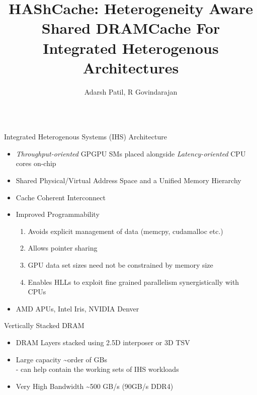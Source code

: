 \documentclass[final,t]{beamer}
\title{\LARGE HAShCache: Heterogeneity Aware Shared DRAMCache For Integrated Heterogenous Architectures}
\author{Adarsh Patil, R Govindarajan}
\institute{Department of CSA, Indian Institute of Science, Bangalore }
\begin{document}


\begin{frame}[t,fragile]{}
\begin{columns}[t]

\footnotesize
\begin{column}{.47\linewidth}

    \begin{exampleblock}{Integrated Heterogenous Systems (IHS) Architecture}
    \begin{itemize}
    	\item \textit{Throughput-oriented} GPGPU SMs placed alongside \textit{Latency-oriented} CPU cores on-chip
   		\item Shared Physical/Virtual Address Space and a Unified Memory Hierarchy 
		\item Cache Coherent Interconnect
    	\item Improved Programmability
    	\begin{enumerate}[i]
	    	\item Avoids explicit management of data (memcpy, cudamalloc etc.)
	    	\item Allows pointer sharing
	    	\item GPU data set sizes need not be constrained by memory size
	    	\item Enables HLLs to exploit fine grained parallelism synergistically with CPUs
    	\end{enumerate}
		\item AMD APUs, Intel Iris, NVIDIA Denver
    \end{itemize}
    \end{exampleblock}
    \begin{exampleblock}{Vertically Stacked DRAM}
    \begin{itemize}
        	\item DRAM Layers stacked using 2.5D interposer or 3D TSV
       		\item Large capacity \textasciitilde order of GBs \\
       				\qquad - can help contain the working sets of IHS workloads
    		\item Very High Bandwidth \textasciitilde 500 GB/s (90GB/s DDR4)\\

\end{itemize}
\end{exampleblock}
\end{column}
\end{columns}
\end{frame}
\end{document}
